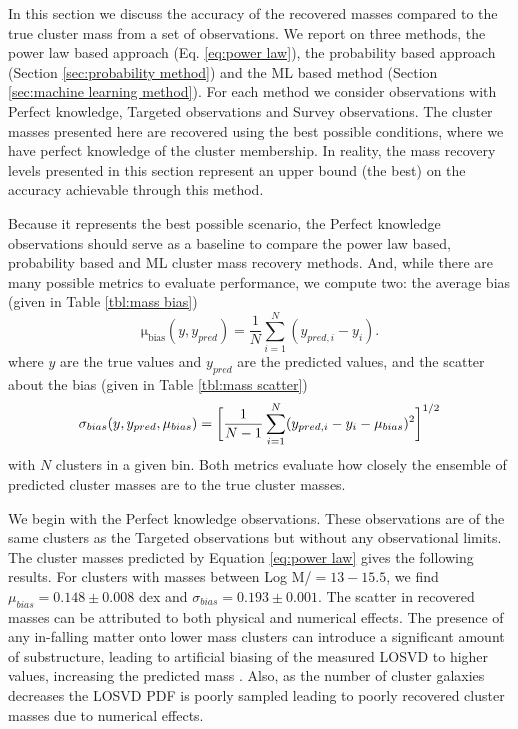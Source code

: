 \documentclass[fleqn,usenatbib]{mnras}
\begin{document}
In this section we discuss the accuracy of the recovered masses compared to the true cluster mass from a set of observations. We report on three methods, the power law based approach (Eq. \ref{eq:power law}), the probability based approach (Section \ref{sec:probability method}) and the ML based method (Section \ref{sec:machine learning method}). For each method we consider observations with Perfect knowledge, Targeted observations and Survey observations. The cluster masses presented here are recovered using the best possible conditions, where we have perfect knowledge of the cluster membership. In reality, the mass recovery levels presented in this section represent an upper bound (the best) on the accuracy achievable through this method.

Because it represents the best possible scenario, the Perfect knowledge observations should serve as a baseline to compare the power law based, probability based and ML cluster mass recovery methods. And, while there are many possible metrics to evaluate performance, we compute two: the average bias (given in Table \ref{tbl:mass bias})
\begin{equation}\label{eqn: bias}
\mathrm{\mu_{bias}}(y,y_{pred}) = \frac{1}{N} \sum_{i=1}^N (y_{pred,i} - y_i).
\end{equation}
where $y$ are the true values and $y_{pred}$ are the predicted values, and the scatter about the bias (given in Table \ref{tbl:mass scatter})
\begin{equation}\label{eqn: scatter}
	\sigma_{bias}(y,y_{pred}, \mu_{bias}) = \bigg{[}\frac{1}{N-1} \sum_{i=1}^N (y_{pred,i} - y_i - \mu_{bias})^2 \bigg{]}^{1/2}
\end{equation}
with $N$ clusters in a given bin. Both metrics evaluate how closely the ensemble of predicted cluster masses are to the true cluster masses.

We begin with the Perfect knowledge observations. These observations are of the same clusters as the Targeted observations but without any observational limits. The cluster masses predicted by Equation \ref{eq:power law} gives the following results. For clusters with masses between Log M/\Msol $= 13 - 15.5$, we find $\mu_{bias} = 0.148\pm{0.008}$ dex and $\sigma_{bias} = 0.193\pm{0.001}$. The scatter in recovered masses can be attributed to both physical and numerical effects. The presence of any in-falling matter onto lower mass clusters can introduce a significant amount of substructure, leading to artificial biasing of the measured LOSVD to higher values, increasing the predicted mass . Also, as the number of cluster galaxies decreases the LOSVD PDF is poorly sampled leading to poorly recovered cluster masses due to numerical effects. 
\end{document}
